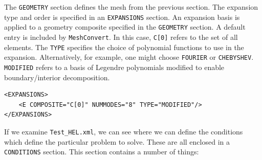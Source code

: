 \documentclass[a4paper,12pt]{article}
\begin{document}
The \texttt{GEOMETRY} section defines the mesh from the previous section. The
expansion type and order is specified in an \texttt{EXPANSIONS} section. An
expansion basis is applied to a geometry composite specified in the
\texttt{GEOMETRY} section. A default entry is included by \texttt{MeshConvert}.
In this case, \texttt{C[0]} refers to the set of all elements. The \texttt{TYPE}
specifies the choice of polynomial functions to use in the expansion.
Alternatively, for example, one might choose \texttt{FOURIER} or
\texttt{CHEBYSHEV}. \texttt{MODIFIED} refers to a basis of Legendre polynomials
modified to enable boundary/interior decomposition.

\begin{verbatim}
<EXPANSIONS>
    <E COMPOSITE="C[0]" NUMMODES="8" TYPE="MODIFIED"/>
</EXPANSIONS>
\end{verbatim}

If we examine \texttt{Test\_HEL.xml}, we can see where we can define the
conditions which define the particular problem to solve. These are all enclosed
in a \texttt{CONDITIONS} section. This section contains a number of things:
\end{document}
